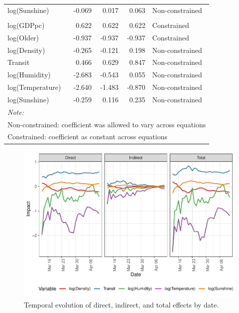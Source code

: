 \documentclass[]{elsarticle} %
\makeatletter
\def\maxwidth{\ifdim\Gin@nat@width>\linewidth\linewidth
\else\Gin@nat@width\fi}
\let\Oldincludegraphics\includegraphics
\renewcommand{\includegraphics}[1]{\Oldincludegraphics[width=\maxwidth]{#1}}
\makeatother
\begin{document}
\begin{table}
\begin{tabular}[t]{lrrrl}
\hspace{1em}log(Sunshine) & -0.069 & 0.017 & 0.063 & Non-constrained\\
\rowcolor{gray!6}  \addlinespace[0.3em]
\multicolumn{5}{l}{\textbf{Total Effects}}\\
\hspace{1em}log(GDPpc) & 0.622 & 0.622 & 0.622 & Constrained\\
\hspace{1em}log(Older) & -0.937 & -0.937 & -0.937 & Constrained\\
\rowcolor{gray!6}  \hspace{1em}log(Density) & -0.265 & -0.121 & 0.198 & Non-constrained\\
\hspace{1em}Transit & 0.466 & 0.629 & 0.847 & Non-constrained\\
\rowcolor{gray!6}  \hspace{1em}log(Humidity) & -2.683 & -0.543 & 0.055 & Non-constrained\\
\hspace{1em}log(Temperature) & -2.640 & -1.483 & -0.870 & Non-constrained\\
\rowcolor{gray!6}  \hspace{1em}log(Sunshine) & -0.259 & 0.116 & 0.235 & Non-constrained\\
\bottomrule
\multicolumn{5}{l}{\textit{Note: }}\\
\multicolumn{5}{l}{Non-constrained: coefficient was allowed to vary across equations}\\
\multicolumn{5}{l}{Constrained: coefficient as constant across equations}\\
\end{tabular}
\end{table}

\begin{figure}
\centering
\includegraphics{Environmental-Correlates-of-COVID19-Spain_files/figure-latex/plot-impacts-1.pdf}
\caption{\label{fig:plot-impacts}Temporal evolution of direct, indirect,
and total effects by date.}
\end{figure}
\end{document}
